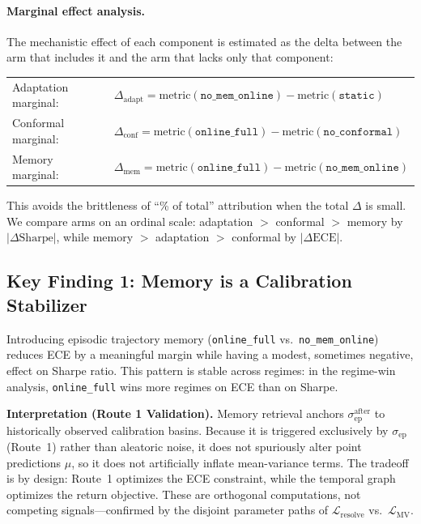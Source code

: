 \documentclass[11pt,a4paper]{article}
\newcommand{\sep}{\sigma_{\mathrm{ep}}}
\newcommand{\sepa}{\sigma_{\mathrm{ep}}^{\mathrm{after}}}
\newcommand{\Lres}{\mathcal{L}_{\mathrm{resolve}}}
\begin{document}
\paragraph{Marginal effect analysis.}
The mechanistic effect of each component is estimated as the delta between
the arm that includes it and the arm that lacks only that component:

\vspace{6pt}
\begin{tabular}{ll}
Adaptation marginal: & $\Delta_{\mathrm{adapt}} = \mathrm{metric}(\texttt{no\_mem\_online}) - \mathrm{metric}(\texttt{static})$ \\
Conformal marginal:  & $\Delta_{\mathrm{conf}} = \mathrm{metric}(\texttt{online\_full}) - \mathrm{metric}(\texttt{no\_conformal})$ \\
Memory marginal:     & $\Delta_{\mathrm{mem}} = \mathrm{metric}(\texttt{online\_full}) - \mathrm{metric}(\texttt{no\_mem\_online})$ \\
\end{tabular}
\vspace{6pt}

This avoids the brittleness of ``\% of total'' attribution when the total
$\Delta$ is small. We compare arms on an ordinal scale: adaptation $>$ conformal
$>$ memory by $|\Delta\mathrm{Sharpe}|$, while memory $>$ adaptation $>$ conformal
by $|\Delta\mathrm{ECE}|$.

\subsection{Key Finding 1: Memory is a Calibration Stabilizer}
\label{sec:memory_finding}

Introducing episodic trajectory memory (\texttt{online\_full} vs.\
\texttt{no\_mem\_online}) reduces ECE by a meaningful margin while having a
modest, sometimes negative, effect on Sharpe ratio.  This pattern is stable
across regimes: in the regime-win analysis, \texttt{online\_full} wins more
regimes on ECE than on Sharpe.

\textbf{Interpretation (Route 1 Validation).}  Memory retrieval anchors $\sepa$ to historically
observed calibration basins.  Because it is triggered exclusively by $\sep$ (Route~1)
rather than aleatoric noise, it does not spuriously alter point predictions $\mu$,
so it does not artificially inflate mean-variance terms.  The tradeoff is by design:
Route~1 optimizes the ECE constraint, while the temporal graph optimizes the return objective.
These are orthogonal computations, not competing signals—confirmed by the
disjoint parameter paths of $\Lres$ vs.\ $\mathcal{L}_{\mathrm{MV}}$.
\end{document}
